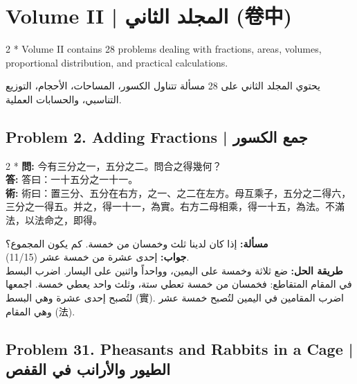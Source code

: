 \documentclass[11pt,a4paper]{article}
\newcommand{\ar}[1]{\arabicfont\beginR #1\endR}
\newcommand{\zh}[1]{{\CJKfamily{}#1}}
\begin{document}
\section{Volume II | \ar{المجلد الثاني} (\zh{卷中})}

\begin{paracol}{2}
\switchcolumn[0]*\noindent
Volume II contains 28 problems dealing with fractions, areas, volumes, proportional distribution, and practical calculations.

\switchcolumn
\noindent
\ar{يحتوي المجلد الثاني على 28 مسألة تتناول الكسور، المساحات، الأحجام، التوزيع التناسبي، والحسابات العملية.}
\end{paracol}

\subsection*{Problem 2. Adding Fractions | \ar{جمع الكسور}}

\begin{paracol}{2}
\switchcolumn[0]*\noindent
\textbf{\zh{問}:} \zh{今有三分之一，五分之二。問合之得幾何？}\\
\textbf{\zh{答}:} \zh{答曰：一十五分之一十一。}\\
\textbf{\zh{術}:} \zh{術曰：置三分、五分在右方，之一、之二在左方。母互乘子，五分之二得六，三分之一得五。并之，得一十一，為實。右方二母相乘，得一十五，為法。不滿法，以法命之，即得。}

\switchcolumn
\noindent
\textbf{\ar{مسألة:}} \ar{إذا كان لدينا ثلث وخمسان من خمسة. كم يكون المجموع؟}\\
\textbf{\ar{جواب:}} \ar{إحدى عشرة من خمسة عشر (11/15).}\\
\textbf{\ar{طريقة الحل:}} \ar{ضع ثلاثة وخمسة على اليمين، وواحداً واثنين على اليسار. اضرب البسط في المقام المتقاطع: فخمسان من خمسة تعطي ستة، وثلث واحد يعطي خمسة. اجمعها لتُصبح إحدى عشرة وهي البسط (實). اضرب المقامين في اليمين لتُصبح خمسة عشر وهي المقام (法).}
\end{paracol}

\subsection*{Problem 31. Pheasants and Rabbits in a Cage | \ar{الطيور والأرانب في القفص}}
\end{document}
